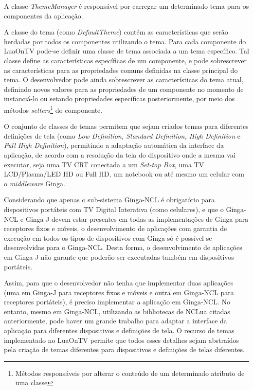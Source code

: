 A classe \textit{ThemeManager} é responsável por carregar um determinado tema para os componentes
da aplicação.

A classe do tema (como \textit{DefaultTheme}) contém as características que serão herdadas por todos os componentes
utilizando o tema. Para cada componente do LuaOnTV pode-se definir uma classe de tema
associada a um tema específico. Tal classe define as características específicas
de um componente, e pode sobrescrever as características para as propriedades
comuns definidas na classe principal do tema. O desenvolvedor pode ainda sobrescrever
as características do tema atual, definindo novos valores para as propriedades
de um componente no momento de instanciá-lo ou setando propriedades específicas
posteriormente, por meio dos métodos \textit{setters}\footnote{Métodos responsáveis por alterar o conteúdo de um determinado atributo de uma classe} do componente.

O conjunto de classes de temas permitem que sejam criados temas para
diferentes definições de tela (como \textit{Low Definition, Standard Definition, 
High Definition} e \textit{Full High Definition}), permitindo a adaptação automática
da interface da aplicação, de acordo com a resolução da tela do dispositivo
onde a mesma vai executar, seja uma TV CRT conectada a um \textit{Set-top Box}, uma TV LCD/Plasma/LED
HD ou Full HD, um notebook ou até mesmo um celular com o \textit{middleware} Ginga.

Considerando que apenas o sub-sistema Ginga-NCL é obrigatório para dispositivos portáteis 
com TV Digital Interativa (como celulares), e que o Ginga-NCL e Ginga-J devem
estar presentes em todas as implementações de Ginga para receptores fixos e móveis,
o desenvolvimento de aplicações com garantia de execução em todos os tipos de dispositivos com 
Ginga só é possível se desenvolvidas para o Ginga-NCL. Desta forma, o desenvolvimento
de aplicações em Ginga-J não garante que poderão ser executadas também em dispositivos portáteis.

Assim, para que o desenvolvedor não tenha que implementar duas aplicações (uma em Ginga-J
para receptores fixos e móveis e outra em Ginga-NCL para receptores portáteis), é preciso
implementar a aplicação em Ginga-NCL. No entanto, mesmo em Ginga-NCL, utilizando
as bibliotecas de NCLua citadas anteriormente, pode haver um grande trabalho para
adaptar a interface da aplicação para diferentes dispositivos e definições de tela.
O recurso de temas implementado no LuaOnTV permite que todos esses detalhes sejam abstraídos
pela criação de temas diferentes para dispositivos e definições de telas diferentes.

